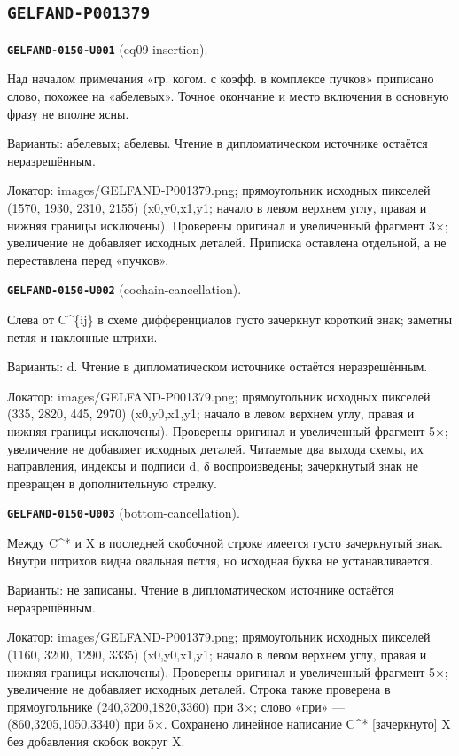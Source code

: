 \documentclass[11pt]{article}
\theoremstyle{definition}
\theoremstyle{remark}
\begin{document}
\subsection*{\texttt{GELFAND-P001379}}
\noindent\leavevmode{}\label{GELFAND-P001379:eq09-insertion:note}\textbf{\texttt{GELFAND-0150-U001}} (eq09-insertion).\par\nopagebreak[4]
Над началом примечания «гр. когом. с коэфф. в комплексе пучков» приписано слово, похожее на «абелевых». Точное окончание и место включения в основную фразу не вполне ясны.\par
Варианты: абелевых; абелевы. Чтение в дипломатическом источнике остаётся неразрешённым.\par
Локатор: images/GELFAND-P001379.png; прямоугольник исходных пикселей (1570, 1930, 2310, 2155) (x0,y0,x1,y1; начало в левом верхнем углу, правая и нижняя границы исключены). Проверены оригинал и увеличенный фрагмент 3×; увеличение не добавляет исходных деталей. Приписка оставлена отдельной, а не переставлена перед «пучков».\par\medskip
\noindent\leavevmode{}\label{GELFAND-P001379:cochain-cancellation:note}\textbf{\texttt{GELFAND-0150-U002}} (cochain-cancellation).\par\nopagebreak[4]
Слева от C\textasciicircum{}\{ij\} в схеме дифференциалов густо зачеркнут короткий знак; заметны петля и наклонные штрихи.\par
Варианты: d. Чтение в дипломатическом источнике остаётся неразрешённым.\par
Локатор: images/GELFAND-P001379.png; прямоугольник исходных пикселей (335, 2820, 445, 2970) (x0,y0,x1,y1; начало в левом верхнем углу, правая и нижняя границы исключены). Проверены оригинал и увеличенный фрагмент 5×; увеличение не добавляет исходных деталей. Читаемые два выхода схемы, их направления, индексы и подписи d, δ воспроизведены; зачеркнутый знак не превращен в дополнительную стрелку.\par\medskip
\noindent\leavevmode{}\label{GELFAND-P001379:bottom-cancellation:note}\textbf{\texttt{GELFAND-0150-U003}} (bottom-cancellation).\par\nopagebreak[4]
Между C\textasciicircum{}* и X в последней скобочной строке имеется густо зачеркнутый знак. Внутри штрихов видна овальная петля, но исходная буква не устанавливается.\par
Варианты: не записаны. Чтение в дипломатическом источнике остаётся неразрешённым.\par
Локатор: images/GELFAND-P001379.png; прямоугольник исходных пикселей (1160, 3200, 1290, 3335) (x0,y0,x1,y1; начало в левом верхнем углу, правая и нижняя границы исключены). Проверены оригинал и увеличенный фрагмент 5×; увеличение не добавляет исходных деталей. Строка также проверена в прямоугольнике (240,3200,1820,3360) при 3×; слово «при» — (860,3205,1050,3340) при 5×. Сохранено линейное написание C\textasciicircum{}* [зачеркнуто] X без добавления скобок вокруг X.\par\medskip
\end{document}
